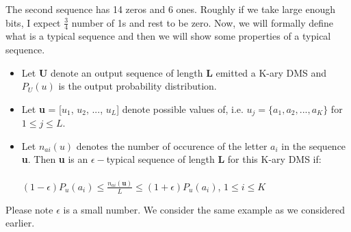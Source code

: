 \documentclass[11pt]{article}
\begin{document}
The second sequence has 14 zeros and 6 ones. Roughly if we take large enough bits, I expect $\frac{3}{4}$ number of 1s and rest to be zero. Now, we will formally define what is a typical sequence and then we will show some properties of a typical sequence.

\begin{itemize}
\item Let \textbf{U} denote an output sequence of length \textbf{L} emitted a K-ary DMS and $P_{U}(u)$ is the output probability distribution.
\item Let \textbf{u} = [$u_{1}$, $u_{2}$, ..., $u_{L}$] denote possible values of, i.e. $u_{j} = \{{a_{1}, a_{2}, ..., a_{K}}\}$ for $1 \leq j \leq L$.
\item Let $n_{ai}(u)$ denotes the number of occurence of the letter $a_{i}$ in the sequence \textbf{u}. Then \textbf{u} is an $\epsilon-$typical sequence of length \textbf{L} for this K-ary DMS if: \\ \\
$(1 - \epsilon)P_{u}(a_{i}) \leq \frac{n_{ai}(\textbf{u})}{L} \leq (1 + \epsilon) P_{u}(a_{i})$, $1 \leq i \leq K$
\end{itemize}
Please note $\epsilon$ is a small number. We consider the same example as we considered earlier.
\end{document}
